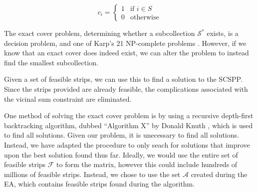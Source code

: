 \documentclass{elsarticle}
\begin{document}
\[c_i =
\begin{cases} 
1 & \text{if } i \in S \\
0 & \text{otherwise} 
\end{cases}
\]

\noindent The exact cover problem, determining whether a subcollection $\mathcal{S}^*$ exists, is a decision problem, and one of Karp's 21 NP-complete problems \cite{karp1972}. However, if we know that an exact cover does indeed exist, we can alter the problem to instead find the smallest subcollection.

Given a set of feasible strips, we can use this to find a solution to the SCSPP. Since the strips provided are already feasible, the complications associated with the vicinal sum constraint are eliminated.

One method of solving the exact cover problem is by using a recursive depth-first backtracking algorithm, dubbed ``Algorithm X'' by Donald Knuth \cite{knuth2000}, which is used to find all solutions. Given our problem, it is unecessary to find all solutions. Instead, we have adapted the procedure to only seach for solutions that improve upon the best solution found thus far. Ideally, we would use the entire set of feasible strips $\mathcal{F}$ to form the matrix, however this could include hundreds of millions of feasible strips. Instead, we chose to use the set $\mathcal{A}$ created during the EA, which contains feasible strips found during the algorithm.
\end{document}
